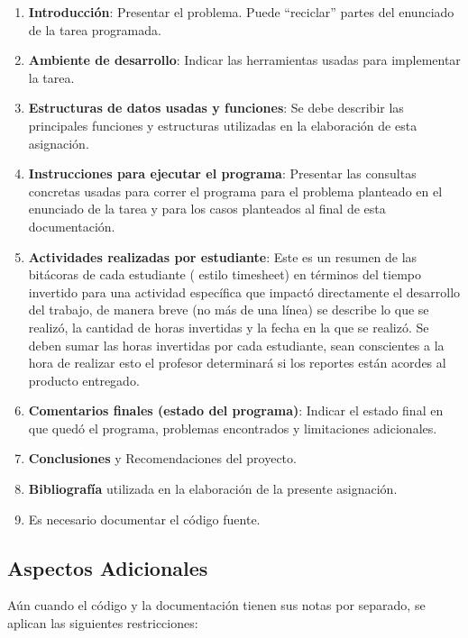 \documentclass{article}
\providecommand{\tightlist}{%
          \setlength{\itemsep}{0pt}\setlength{\parskip}{0pt}}
\begin{document}
\begin{enumerate}
\def\labelenumi{\arabic{enumi}.}
\tightlist
\item
  \textbf{Introducción}: Presentar el problema. Puede ``reciclar''
  partes del enunciado de la tarea programada.
\item
  \textbf{Ambiente de desarrollo}: Indicar las herramientas usadas para
  implementar la tarea.
\item
  \textbf{Estructuras de datos usadas y funciones}: Se debe describir
  las principales funciones y estructuras utilizadas en la elaboración
  de esta asignación.
\item
  \textbf{Instrucciones para ejecutar el programa}: Presentar las
  consultas concretas usadas para correr el programa para el problema
  planteado en el enunciado de la tarea y para los casos planteados al
  final de esta documentación.
\item
  \textbf{Actividades realizadas por estudiante}: Este es un resumen de
  las bitácoras de cada estudiante ( estilo timesheet) en términos del
  tiempo invertido para una actividad específica que impactó
  directamente el desarrollo del trabajo, de manera breve (no más de una
  línea) se describe lo que se realizó, la cantidad de horas invertidas
  y la fecha en la que se realizó. Se deben sumar las horas invertidas
  por cada estudiante, sean conscientes a la hora de realizar esto el
  profesor determinará si los reportes están acordes al producto
  entregado.
\item
  \textbf{Comentarios finales (estado del programa)}: Indicar el estado
  final en que quedó el programa, problemas encontrados y limitaciones
  adicionales.
\item
  \textbf{Conclusiones} y Recomendaciones del proyecto.
\item
  \textbf{Bibliografía} utilizada en la elaboración de la presente
  asignación.
\item
  Es necesario documentar el código fuente.
\end{enumerate}

\subsection{Aspectos Adicionales}\label{aspectos-adicionales}

Aún cuando el código y la documentación tienen sus notas por separado,
se aplican las siguientes restricciones:
\end{document}
